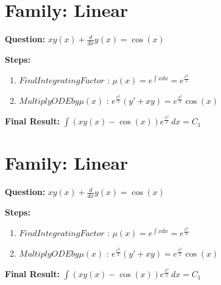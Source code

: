\documentclass{article}
\begin{document}
\section*{Family: Linear}
\textbf{Question:} $x y{\left(x \right)} + \frac{d}{d x} y{\left(x \right)} = \cos{\left(x \right)}$

\textbf{Steps:}
\begin{enumerate}
\item $Find Integrating Factor$ :  $\mu(x) = e^{\int x dx} = e^{\frac{x^{2}}{2}}$
\item $Multiply ODE by \mu(x)$ :  $e^{\frac{x^{2}}{2}}(y' + xy) = e^{\frac{x^{2}}{2}} \cos{\left(x \right)}$
\end{enumerate}
\textbf{Final Result:} $\int \left(x y{\left(x \right)} - \cos{\left(x \right)}\right) e^{\frac{x^{2}}{2}}\, dx = C_{1}$

\section*{Family: Linear}
\textbf{Question:} $x y{\left(x \right)} + \frac{d}{d x} y{\left(x \right)} = \cos{\left(x \right)}$

\textbf{Steps:}
\begin{enumerate}
\item $Find Integrating Factor$ :  $\mu(x) = e^{\int x dx} = e^{\frac{x^{2}}{2}}$
\item $Multiply ODE by \mu(x)$ :  $e^{\frac{x^{2}}{2}}(y' + xy) = e^{\frac{x^{2}}{2}} \cos{\left(x \right)}$
\end{enumerate}
\textbf{Final Result:} $\int \left(x y{\left(x \right)} - \cos{\left(x \right)}\right) e^{\frac{x^{2}}{2}}\, dx = C_{1}$
\end{document}
